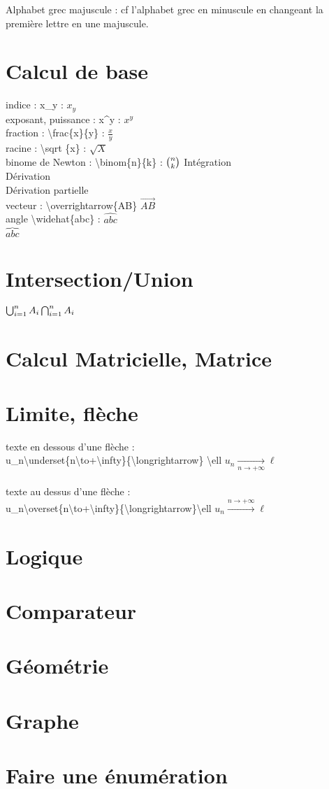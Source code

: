 \documentclass{article}
\begin{document}
Alphabet grec majuscule  : cf l'alphabet grec en minuscule en changeant la première lettre en une majuscule.
\section{Calcul de base}

indice : x\_y : $x_y$\\
exposant, puissance : x\^{ }y : $x^y$\\
fraction : \textbackslash frac\{x\}\{y\} : $\frac{x}{y}$\\
racine : \textbackslash sqrt \{x\} : $\sqrt{X}$\\
binome de Newton : \textbackslash binom\{n\}\{k\} : $\binom{n}{k}\\
$
Intégration\\
Dérivation\\
Dérivation partielle\\
vecteur : \textbackslash overrightarrow\{AB\} $\overrightarrow{AB}$\\
angle \textbackslash widehat\{abc\} : $\widehat{abc}$\\
$\overbrace{abc}$

\section{Intersection/Union}
$
\bigcup_{i=1}^n A_i\\
\bigcap_{i=1}^n A_i$
\section{Calcul Matricielle, Matrice}


\section{Limite, flèche}
texte en dessous d'une flèche :\\
u\_n\textbackslash underset\{n\textbackslash to+\textbackslash infty\}\{\textbackslash longrightarrow\} \textbackslash ell  $u_n\underset{n\to+\infty}{\longrightarrow}\ell$\\
    \\
    texte au dessus d'une flèche :\\
    u\_n\textbackslash overset\{n\textbackslash to+\textbackslash infty\}\{\textbackslash longrightarrow\}\textbackslash ell
    $u_n\overset{n\to+\infty}{\longrightarrow}\ell$
\section{Logique}

\section{Comparateur}

\section{Géométrie}

\section{Graphe}

\section{Faire une énumération}
\end{document}
